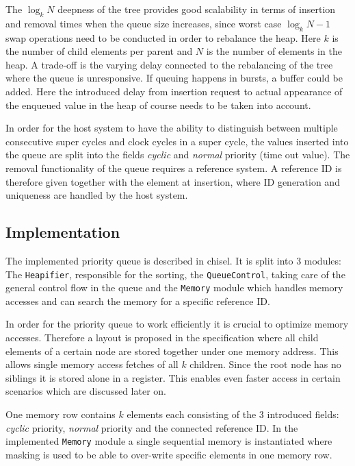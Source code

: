 \documentclass[conference]{IEEEtran}
\begin{document}
The $\log_k N$ deepness of the tree provides good scalability in terms of insertion and removal times when the queue size increases, 
since worst case $\log_k N-1$ swap operations need to be conducted in order to rebalance the heap. Here $k$ is the number of child elements per parent and $N$
is the number of elements in the heap. A trade-off is the varying delay connected to the rebalancing of the tree where the queue is unresponsive. If queuing
happens in bursts, a buffer could be added. Here the introduced delay from insertion request to actual appearance of the enqueued value in the heap of course needs
to be taken into account.

In order for the host system to have the ability to distinguish between multiple consecutive super cycles and clock cycles in a super cycle, the values inserted 
into the queue are split into the fields \textit{cyclic} and \textit{normal} priority (time out value). The removal functionality of the queue requires a reference system. A reference 
ID is therefore given together with the element at insertion, where ID generation and uniqueness are handled by the host system.

\subsection{Implementation}

The implemented priority queue is described in chisel.
It is split into 3 modules: The \texttt{Heapifier}, responsible for the sorting, the \texttt{QueueControl}, taking care
of the general control flow in the queue and the \texttt{Memory} module which handles memory accesses and can search the memory for a specific reference 
ID.

In order for the priority queue to work efficiently it is crucial to optimize memory accesses. Therefore a layout is proposed in the specification where all 
child elements of a certain node are stored together under one memory address. This allows single memory access fetches of all $k$ children. Since 
the root node has no siblings it is stored alone in a register. This enables even faster access in certain scenarios which are discussed later on.

One memory row contains $k$ elements each consisting of the 3 introduced fields: \textit{cyclic} priority, \textit{normal} priority and the connected
reference ID. In the implemented 
\texttt{Memory} module a single sequential memory is instantiated where masking is used to be able to over-write specific elements in one memory row.
\end{document}
